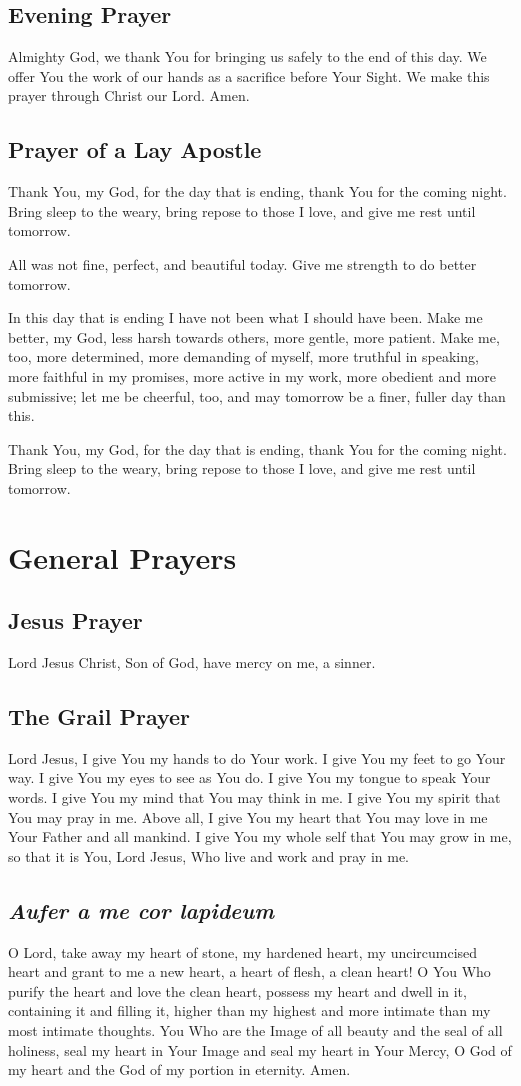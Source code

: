 \documentclass[12pt]{article}
\newcommand{\prayersection}[1]{\section{#1}}
\newcommand{\prayertitle}[1]{\subsection{#1}}
\newcommand{\emphasis}[1]{\emph{#1}}
\newcommand{\emphasis}[1]{\textsl{#1}}
\newcommand{\foreign}[1]{\emphasis{#1}}
\begin{document}
\prayertitle{Evening Prayer}
Almighty God, we thank You for bringing us safely to the end of this day.
We offer You the work of our hands as a sacrifice before Your Sight.
We make this prayer through Christ our Lord.
Amen.

\prayertitle{Prayer of a Lay Apostle}
\label{prayer:lay_apostle}
Thank You, my God, for the day that is ending, thank You for the coming night.
Bring sleep to the weary, bring repose to those I love, and give me rest until tomorrow.

All was not fine, perfect, and beautiful today.
Give me strength to do better tomorrow.

In this day that is ending I have not been what I should have been.
Make me better, my God, less harsh towards others, more gentle, more patient.
Make me, too, more determined, more demanding of myself, more truthful in speaking, more faithful in my promises, more active in my work, more obedient and more submissive;
let me be cheerful, too, and may tomorrow be a finer, fuller day than this.

Thank You, my God, for the day that is ending, thank You for the coming night.
Bring sleep to the weary, bring repose to those I love, and give me rest until tomorrow.

\prayersection{General Prayers}
\prayertitle{Jesus Prayer}
\label{prayer:Jesus}
Lord Jesus Christ, Son of God, have mercy on me, a sinner.

\prayertitle{The Grail Prayer}
Lord Jesus,
I give You my hands to do Your work.
I give You my feet to go Your way.
I give You my eyes to see as You do.
I give You my tongue to speak Your words.
I give You my mind that You may think in me.
I give You my spirit that You may pray in me.
Above all, I give You my heart that You may love in me Your Father and all mankind.
I give You my whole self that You may grow in me, so that it is You, Lord Jesus,
Who live and work and pray in me.

\prayertitle{\foreign{Aufer a me cor lapideum}}
\label{prayer:take_heart_of_stone}
O Lord, take away my heart of stone, my hardened heart, my uncircumcised heart and grant to me a new heart, a heart of flesh, a clean heart!
O You Who purify the heart and love the clean heart, possess my heart and dwell in it, containing it and filling it, higher than my highest and more intimate than my most intimate thoughts.
You Who are the Image of all beauty and the seal of all holiness, seal my heart in Your Image and seal my heart in Your Mercy, O God of my heart and the God of my portion in eternity.
Amen.
\end{document}

